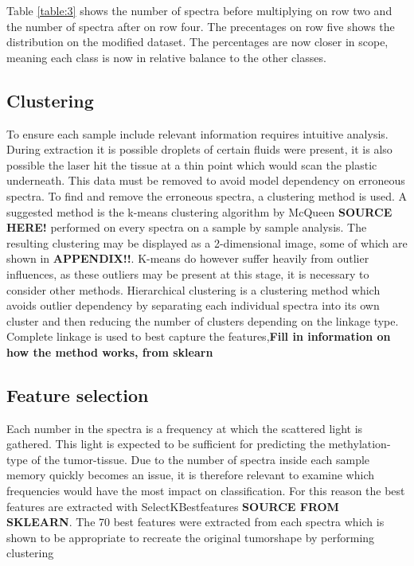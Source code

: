 Table \ref{table:3} shows the number of spectra before multiplying on row two and the number of spectra after on row four. The precentages on row five shows the distribution on the modified dataset. The percentages are now closer in scope,  meaning each class is now in relative balance to the other classes.

\subsection{Clustering}

To ensure each sample include relevant information requires intuitive analysis. During extraction it is possible droplets of certain fluids were present, it is also possible the laser hit the tissue at a thin point which would scan the plastic underneath. This data must be removed to avoid model dependency on erroneous spectra. To find and remove the erroneous spectra, a clustering method is used. A suggested method is the k-means clustering algorithm by McQueen \textbf{SOURCE HERE!} performed on every spectra on a sample by sample analysis. The resulting clustering may be displayed as a 2-dimensional image, some of which are shown in \textbf{APPENDIX!!}. K-means do however suffer heavily from outlier influences, as these outliers may be present at this stage, it is necessary to consider other methods. Hierarchical clustering is a clustering method which avoids outlier dependency by separating each individual spectra into its own cluster and then reducing the number of clusters depending on the linkage type. Complete linkage is used to best capture the features,\textbf{Fill in information on how the method works, from sklearn} 

\subsection{Feature selection}

Each number in the spectra is a frequency at which the scattered light is gathered. This light is expected to be sufficient for predicting the methylation-type of the tumor-tissue. Due to the number of spectra inside each sample memory quickly becomes an issue, it is therefore relevant to examine which frequencies would have the most impact on classification. For this reason the best features are extracted with SelectKBestfeatures \textbf{SOURCE FROM SKLEARN}. The 70 best features were extracted from each spectra which is shown to be appropriate to recreate the original tumorshape by performing clustering 